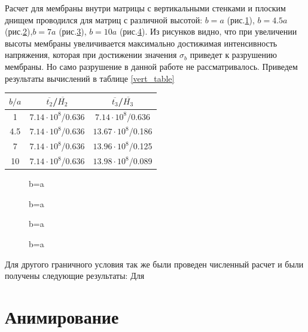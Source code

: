 		
		Расчет для мембраны внутри матрицы с вертикальными стенками и плоским днищем проводился для матриц с различной высотой:
		$b = a$ (рис.\ref{vert_sliging_ba}), $b = 4.5a$ (рис.\ref{vert_sliging_4ba}),$b=7a$ (рис.\ref{vert_sliging_7ba}), $b=10a$ (рис.\ref{vert_sliging_10ba}). Из рисунков видно, что при увеличении высоты мембраны увеличивается максимально достижимая интенсивность напряжения, которая при достижении значения $\sigma_b$ приведет к разрушению мембраны. Но само разрушение в данной работе не рассматривалось.
Приведем результаты вычислений в таблице \ref{vert_table}
\begin{center}

\renewcommand{\arraystretch}{2}
\begin{tabular}{|c|c|c|}
\hline
$b/a$    & $\overline{t_2}$/$\overline{H_2}$ & $\overline{t_3}$/$\overline{H_3}$ \\
\hline\hline
1    & $7.14\cdot10^8$/0.636  & $7.14\cdot10^8$/0.636\\ \hline
4.5  & $7.14\cdot10^8$/0.636  & $13.67\cdot10^8$/0.186\\ \hline
7    & $7.14\cdot10^8$/0.636  & $13.96\cdot10^8$/0.125\\ \hline
10   & $7.14\cdot10^8$/0.636  & $13.98\cdot10^8$/0.089\\ \hline

\end{tabular}
\label{vert_table}
\end{center}
				 
		\begin{figure}[h!]	
				\def\svgwidth{\columnwidth}
				\caption{b=a} 
				\label{vert_sliging_ba}
		\end{figure}

		\begin{figure}[h!]	
				\def\svgwidth{\columnwidth}
				\caption{b=a} 
				\label{vert_sliging_4ba}
		\end{figure}
				\begin{figure}[h!]	
				\def\svgwidth{\columnwidth}
				\caption{b=a} 
				\label{vert_sliging_7ba}
		\end{figure}
				\begin{figure}[h!]	
				\def\svgwidth{\columnwidth}
				\caption{b=a} 
				\label{vert_sliging_10ba}
		\end{figure}

Для другого граничного условия так же были проведен численный расчет и были получены следующие результаты:
Для
		
\clearpage
\section{Анимирование}
